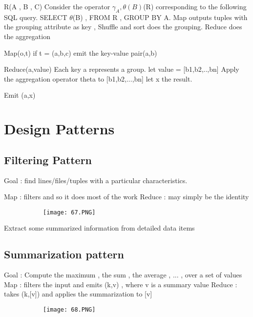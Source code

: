 \documentclass{article}
\begin{document}
R(A , B , C) 
Consider the operator $\gamma_A,\theta(B)$(R) corresponding to the following SQL query. SELECT $\theta$(B) , FROM R , GROUP BY A.
Map outputs tuples with the grouping attribute as key , Shuffle and sort does the grouping. Reduce does the aggregation

Map(o,t)
if t = (a,b,c) emit the key-value pair(a,b)

Reduce(a,value)
Each key a represents a group.
let value = [b1,b2,..,bn]
Apply the aggregation operator theta to [b1,b2,...,bn] 
let x the result.

Emit (a,x)

\section{Design Patterns}
\subsection{Filtering Pattern}

Goal : find lines/files/tuples with a particular characteristics.

Map : filters and so it does most of the work
Reduce : may simply be the identity

\begin{figure}[ht!]
  \centering
  \begin{subfigure}[b]{0.5\linewidth}
    \texttt{[image: 67.PNG]}
  \end{subfigure}
\end{figure}

Extract some summarized information from detailed data items

\subsection{Summarization pattern}

Goal : Compute the maximum , the sum , the average , ... , over a set of values
Map : filters the input and emits (k,v) , where v is a summary value
Reduce : takes (k,[v]) and applies the summarization to [v]




\begin{figure}[ht!]
  \centering
  \begin{subfigure}[b]{0.5\linewidth}
    \texttt{[image: 68.PNG]}
  \end{subfigure}
\end{figure}
\end{document}
